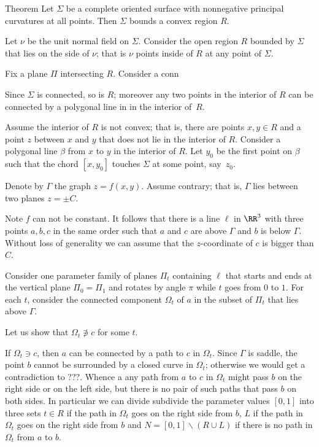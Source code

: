 \begin{thm}{Theorem}
Let $\Sigma$ be a complete oriented surface with 
nonnegative principal curvatures at all points.
Then $\Sigma$ bounds a convex region $R$.
\end{thm}

Let $\nu$ be the unit normal field on $\Sigma$.
Consider the open region $R$ bounded by $\Sigma$ that lies on the side of $\nu$;
that is $\nu$ points inside of $R$ at any point of $\Sigma$.

Fix a plane $\Pi$ intersecting $R$.
Consider a conn

Since $\Sigma$ is connected, so is $R$;
moreover any two points in the interior of $R$ can be connected by a polygonal line in in the interior of~$R$.

Assume the interior of $R$ is not convex; that is, there are points $x,y\in R$ and a point $z$ between $x$ and $y$ that does not lie in the interior of $R$.
Consider a polygonal  line $\beta$ from $x$ to $y$ in the interior of $R$.
Let $y_0$ be the first point on $\beta$ such that the chord $[x,y_0]$ touches $\Sigma$ at some point, say~$z_0$.

\qeds












Denote by $\Gamma$ the graph $z=f(x,y)$.
Assume contrary; that is, $\Gamma$ lies between two planes $z=\pm C$.

Note $f$ can not be constant.
It follows that there is a line $\ell$ in $\RR^3$ with three points $a,b,c$ in the same order such that 
$a$ and $c$ are above $\Gamma$ and $b$ is below $\Gamma$.
Without loss of generality we can assume that the $z$-coordinate of $c$ is bigger than $C$.

Consider one parameter family of planes $\Pi_t$ containing $\ell$ that starts and ends at the vertical plane $\Pi_0=\Pi_1$ and rotates by angle $\pi$ while $t$ goes from $0$ to $1$.
For each $t$, consider the connected component $\Omega_t$ of $a$ in the subset of $\Pi_t$ that lies above $\Gamma$.

Let us show that $\Omega_t\not\ni c$ for some $t$.

If  $\Omega_t\ni c$, then $a$ can be connected by a path to $c$ in $\Omega_t$.
Since $\Gamma$ is saddle, the point $b$ cannot be surrounded by a closed curve in $\Omega_t$;
otherwise we would get a contradiction to ???.
Whence a any path from $a$ to $c$ in $\Omega_t$ might pass $b$ on the right side or on the left side,
but there is no pair of such paths that pass $b$ on both sides.
In particular we can divide subdivide the parameter values $[0,1]$ into three sets $t\in R$ if the path  in $\Omega_t$  goes on the right side from $b$,  $L$ if the path in $\Omega_t$ goes on the right side from $b$ and $N=[0,1]\backslash(R\cup L)$ if there is no path in $\Omega_t$ from $a$ to $b$.

